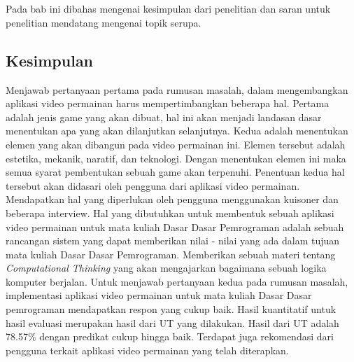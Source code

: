 \chapter{\babLima}
Pada bab ini dibahas mengenai kesimpulan dari penelitian dan saran untuk penelitian
mendatang mengenai topik serupa.
\section{Kesimpulan}
Menjawab pertanyaan pertama pada rumusan masalah, dalam mengembangkan aplikasi video permainan harus mempertimbangkan beberapa hal. Pertama adalah jenis game yang akan dibuat, hal ini akan menjadi landasan dasar menentukan apa yang akan dilanjutkan selanjutnya. Kedua adalah menentukan elemen yang akan dibangun pada video permainan ini. Elemen tersebut adalah estetika, mekanik, naratif, dan teknologi. Dengan menentukan elemen ini maka semua syarat pembentukan sebuah game akan terpenuhi. Penentuan kedua hal tersebut akan didasari oleh pengguna dari aplikasi video permainan. Mendapatkan hal yang diperlukan oleh pengguna menggunakan kuisoner dan beberapa interview. Hal yang dibutuhkan untuk membentuk sebuah aplikasi video permainan untuk mata kuliah Dasar Dasar Pemrograman adalah sebuah rancangan sistem yang dapat memberikan nilai - nilai yang ada dalam tujuan mata kuliah Dasar Dasar Pemrograman. Memberikan sebuah materi tentang \textit{Computational Thinking} yang akan mengajarkan bagaimana sebuah logika komputer berjalan.
\linebreak\linebreak
Untuk menjawab pertanyaan kedua pada rumusan masalah, implementasi aplikasi video permainan untuk mata kuliah Dasar Dasar pemrograman mendapatkan respon yang cukup baik. Hasil kuantitatif untuk hasil evaluasi merupakan hasil dari UT yang dilakukan. Hasil dari UT adalah 78.57\% dengan predikat cukup hingga baik. Terdapat juga rekomendasi dari pengguna terkait aplikasi video permainan yang telah diterapkan.

